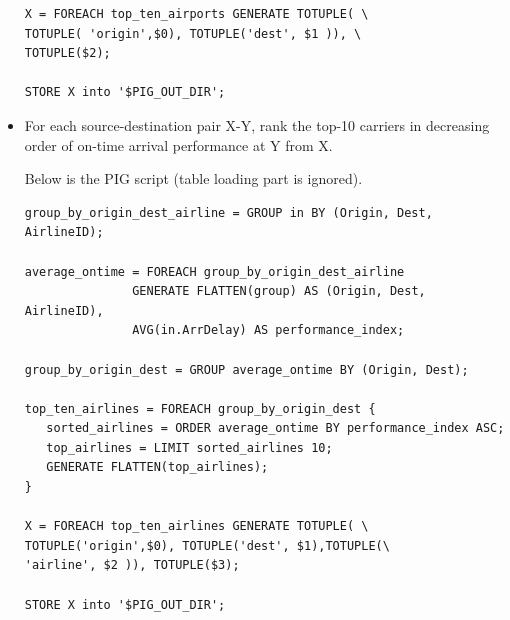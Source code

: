 \documentclass[fontsize=11pt,paper=a4]{scrartcl}
\begin{document}
\begin{itemize}
\begin{verbatim}
X = FOREACH top_ten_airports GENERATE TOTUPLE( \
TOTUPLE( 'origin',$0), TOTUPLE('dest', $1 )), \
TOTUPLE($2);

STORE X into '$PIG_OUT_DIR'; 
\end{verbatim}
\normalsize

\item For each source-destination pair X-Y, rank the top-10 carriers in decreasing order of on-time arrival performance at Y from X.

Below is the PIG script (table loading part is ignored). 
\small\begin{verbatim}
group_by_origin_dest_airline = GROUP in BY (Origin, Dest, AirlineID);

average_ontime = FOREACH group_by_origin_dest_airline
               GENERATE FLATTEN(group) AS (Origin, Dest, AirlineID),
               AVG(in.ArrDelay) AS performance_index;

group_by_origin_dest = GROUP average_ontime BY (Origin, Dest);

top_ten_airlines = FOREACH group_by_origin_dest {
   sorted_airlines = ORDER average_ontime BY performance_index ASC;
   top_airlines = LIMIT sorted_airlines 10;
   GENERATE FLATTEN(top_airlines);
}

X = FOREACH top_ten_airlines GENERATE TOTUPLE( \
TOTUPLE('origin',$0), TOTUPLE('dest', $1),TOTUPLE(\
'airline', $2 )), TOTUPLE($3);

STORE X into '$PIG_OUT_DIR';
\end{verbatim}
\normalsize


\end{itemize}
\end{document}
